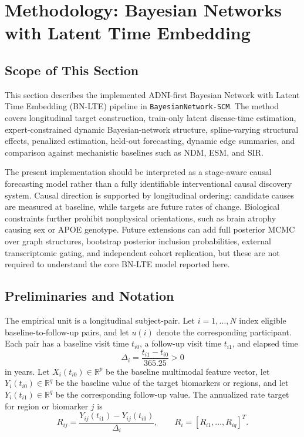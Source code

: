 \section{Methodology: Bayesian Networks with Latent Time Embedding}
\label{sec:bn_lte_methodology}

\subsection{Scope of This Section}

This section describes the implemented ADNI-first Bayesian Network with Latent
Time Embedding (BN-LTE) pipeline in \texttt{BayesianNetwork-SCM}. The method
covers longitudinal target construction, train-only latent disease-time
estimation, expert-constrained dynamic Bayesian-network structure,
spline-varying structural effects, penalized estimation, held-out forecasting,
dynamic edge summaries, and comparison against mechanistic baselines such as
NDM, ESM, and SIR.

The present implementation should be interpreted as a stage-aware causal
forecasting model rather than a fully identifiable interventional causal
discovery system. Causal direction is supported by longitudinal ordering:
candidate causes are measured at baseline, while targets are future rates of
change. Biological constraints further prohibit nonphysical orientations, such
as brain atrophy causing sex or APOE genotype. Future extensions can add full
posterior MCMC over graph structures, bootstrap posterior inclusion
probabilities, external transcriptomic gating, and independent cohort
replication, but these are not required to understand the core BN-LTE model
reported here.

\subsection{Preliminaries and Notation}

The empirical unit is a longitudinal subject-pair. Let $i=1,\ldots,N$ index
eligible baseline-to-follow-up pairs, and let $u(i)$ denote the corresponding
participant. Each pair has a baseline visit time $t_{i0}$, a follow-up visit
time $t_{i1}$, and elapsed time
\begin{equation}
\Delta_i
=
\frac{t_{i1}-t_{i0}}{365.25}
>0
\end{equation}
in years. Let $X_i(t_{i0}) \in \mathbb{R}^p$ be the baseline multimodal
feature vector, let $Y_i(t_{i0}) \in \mathbb{R}^q$ be the baseline value of the
target biomarkers or regions, and let $Y_i(t_{i1}) \in \mathbb{R}^q$ be the
corresponding follow-up value. The annualized rate target for region or
biomarker $j$ is
\begin{equation}
R_{ij}
=
\frac{Y_{ij}(t_{i1}) - Y_{ij}(t_{i0})}{\Delta_i},
\qquad
R_i =
\left[
R_{i1}, \ldots, R_{iq}
\right]^T .
\end{equation}

